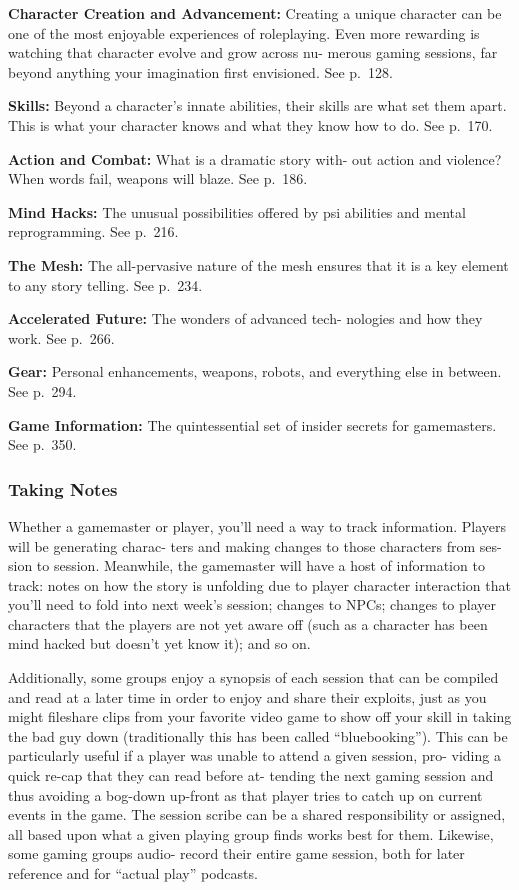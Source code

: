 \textbf{Character Creation and Advancement:} Creating a 
unique character can be one of the most enjoyable 
experiences of roleplaying. Even more rewarding is 
watching that character evolve and grow across nu-
merous gaming sessions, far beyond anything your 
imagination first envisioned. See p. 128.

\textbf{Skills:} Beyond a character's innate abilities, their 
skills are what set them apart. This is what your 
character knows and what they know how to do. See 
p. 170.

\textbf{Action and Combat:} What is a dramatic story with-
out action and violence? When words fail, weapons 
will blaze. See p. 186.

\textbf{Mind Hacks: }The unusual possibilities offered by 
psi abilities and mental reprogramming. See p. 216.

\textbf{The Mesh: }The all-pervasive nature of the mesh 
ensures that it is a key element to any story telling. 
See p. 234.

\textbf{Accelerated Future:} The wonders of advanced tech-
nologies and how they work. See p. 266.

\textbf{Gear:} Personal enhancements, weapons, robots, and 
everything else in between. See p. 294.

\textbf{Game Information:} The quintessential set of insider 
secrets for gamemasters. See p. 350.

\subsubsection{Taking Notes}

Whether a gamemaster or player, you'll need a way to 
track information. Players will be generating charac-
ters and making changes to those characters from ses-
sion to session. Meanwhile, the gamemaster will have 
a host of information to track: notes on how the story 
is unfolding due to player character interaction that 
you'll need to fold into next week's session; changes 
to NPCs; changes to player characters that the players 
are not yet aware off (such as a character has been 
mind hacked but doesn't yet know it); and so on.

Additionally, some groups enjoy a synopsis of 
each session that can be compiled and read at a 
later time in order to enjoy and share their exploits, 
just as you might fileshare clips from your favorite 
video game to show off your skill in taking the 
bad guy down (traditionally this has been called 
``bluebooking''). This can be particularly useful if a 
player was unable to attend a given session, pro-
viding a quick re-cap that they can read before at-
tending the next gaming session and thus avoiding 
a bog-down up-front as that player tries to catch 
up on current events in the game. The session scribe 
can be a shared responsibility or assigned, all based 
upon what a given playing group finds works best 
for them. Likewise, some gaming groups audio-
record their entire game session, both for later 
reference and for ``actual play'' podcasts.

